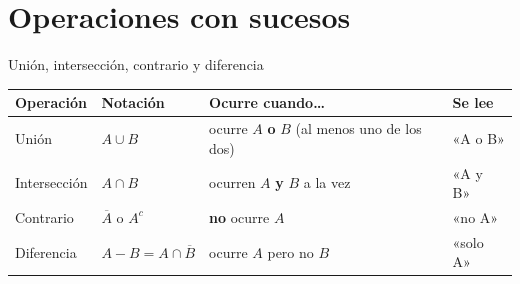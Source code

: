 \documentclass[11pt,a4paper]{article}
\begin{document}
  
\section{Operaciones con sucesos}\hypertarget{sec2}{}

  

  
\begin{fmdef}{Unión, intersección, contrario y diferencia}
\begin{center}\renewcommand{\arraystretch}{1.7}\small\begin{tabularx}{\linewidth}{>{\raggedright\arraybackslash}p{2.4cm}>{\raggedright\arraybackslash}X>{\raggedright\arraybackslash}X>{\raggedright\arraybackslash}X}\toprule
\textbf{Operación} & \textbf{Notación} & \textbf{Ocurre cuando\dots{}} & \textbf{Se lee}\\\midrule
Unión & $A\cup B$ & ocurre $A$ \textbf{o} $B$ (al menos uno de los dos) & «A o B»\\[3pt]
Intersección & $A\cap B$ & ocurren $A$ \textbf{y} $B$ a la vez & «A y B»\\[3pt]
Contrario & $\overline{A}$ o $A^c$ & \textbf{no} ocurre $A$ & «no A»\\[3pt]
Diferencia & $A-B=A\cap\overline{B}$ & ocurre $A$ pero no $B$ & «solo A»\\[3pt]
\bottomrule\end{tabularx}\end{center}


\end{fmdef}
\end{document}
